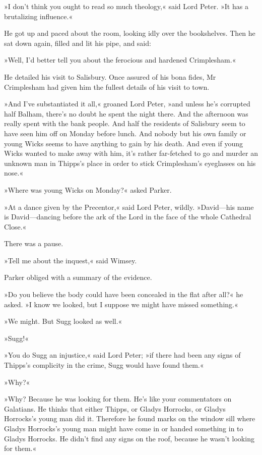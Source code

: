 »I don't think you ought to read so much theology,« said Lord Peter. »It has a brutalizing influence.«

He got up and paced about the room, looking idly over the bookshelves. Then he sat down again, filled and lit his pipe, and said:

»Well, I'd better tell you about the ferocious and hardened Crimplesham.«

He detailed his visit to Salisbury. Once assured of his bona fides, Mr Crimplesham had given him the fullest details of his visit to town.

»And I've substantiated it all,« groaned Lord Peter, »and unless he's corrupted half Balham, there's no doubt he spent the night there. And the afternoon was really spent with the bank people. And half the residents of Salisbury seem to have seen him off on Monday before lunch. And nobody but his own family or young Wicks seems to have anything to gain by his death. And even if young Wicks wanted to make away with him, it's rather far-fetched to go and murder an unknown man in Thipps's place in order to stick Crimplesham's eyeglasses on his nose.«

»Where was young Wicks on Monday?« asked Parker.

»At a dance given by the Precentor,« said Lord Peter, wildly. »David—his name is David—dancing before the ark of the Lord in the face of the whole Cathedral Close.«

There was a pause.

»Tell me about the inquest,« said Wimsey.

Parker obliged with a summary of the evidence.

»Do you believe the body could have been concealed in the flat after all?« he asked. »I know we looked, but I suppose we might have missed something.«

»We might. But Sugg looked as well.«

»Sugg!«

»You do Sugg an injustice,« said Lord Peter; »if there had been any signs of Thipps's complicity in the crime, Sugg would have found them.«

»Why?«

»Why? Because he was looking for them. He's like your commentators on Galatians. He thinks that either Thipps, or Gladys Horrocks, or Gladys Horrocks's young man did it. Therefore he found marks on the window sill where Gladys Horrocks's young man might have come in or handed something in to Gladys Horrocks. He didn't find any signs on the roof, because he wasn't looking for them.«

